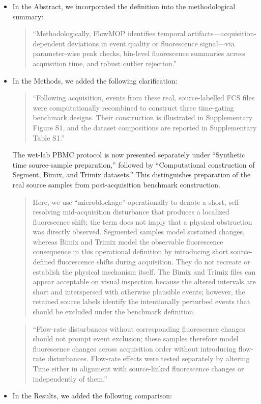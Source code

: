 \documentclass[
  11pt,
  a4paper,
]{article}
\begin{document}
\begin{itemize}
\item
  In the Abstract, we incorporated the definition into the
  methodological summary:

  \begin{quote}
  ``Methodologically, FlowMOP identifies temporal
  artifacts---acquisition-dependent deviations in event quality or
  fluorescence signal---via parameter-wise peak checks, bin-level
  fluorescence summaries across acquisition time, and robust outlier
  rejection.''
  \end{quote}
\item
  In the Methods, we added the following clarification:

  \begin{quote}
  ``Following acquisition, events from these real, source-labelled FCS
  files were computationally recombined to construct three time-gating
  benchmark designs. Their construction is illustrated in Supplementary
  Figure S1, and the dataset compositions are reported in Supplementary
  Table S1.''
  \end{quote}

  The wet-lab PBMC protocol is now presented separately under
  ``Synthetic time source-sample preparation,'' followed by
  ``Computational construction of Segment, Bimix, and Trimix datasets.''
  This distinguishes preparation of the real source samples from
  post-acquisition benchmark construction.

  \begin{quote}
  Here, we use ``microblockage'' operationally to denote a short,
  self-resolving mid-acquisition disturbance that produces a localized
  fluorescence shift; the term does not imply that a physical
  obstruction was directly observed. Segmented samples model sustained
  changes, whereas Bimix and Trimix model the observable fluorescence
  consequence in this operational definition by introducing short
  source-defined fluorescence shifts during acquisition. They do not
  recreate or establish the physical mechanism itself. The Bimix and
  Trimix files can appear acceptable on visual inspection because the
  altered intervals are short and interspersed with otherwise plausible
  events; however, the retained source labels identify the intentionally
  perturbed events that should be excluded under the benchmark
  definition.
  \end{quote}

  \begin{quote}
  ``Flow-rate disturbances without corresponding fluorescence changes
  should not prompt event exclusion; these samples therefore model
  fluorescence changes across acquisition order without introducing
  flow-rate disturbances. Flow-rate effects were tested separately by
  altering Time either in alignment with source-linked fluorescence
  changes or independently of them.''
  \end{quote}
\item
  In the Results, we added the following comparison:


\end{itemize}
\end{document}

